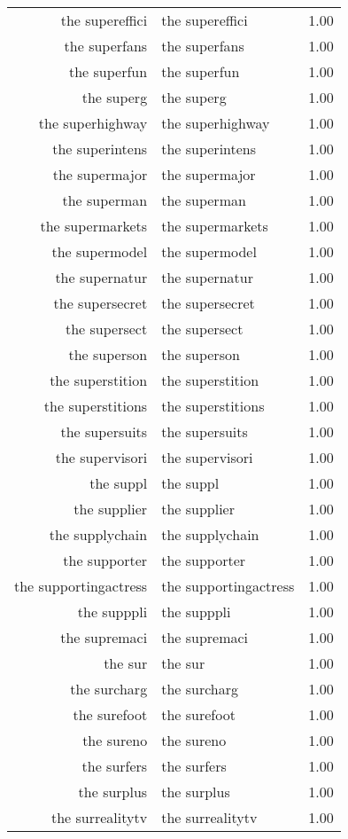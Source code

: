 \begin{table}[ht]
\begin{tabular}{rlr}
  the supereffici & the supereffici & 1.00 \\ 
  the superfans & the superfans & 1.00 \\ 
  the superfun & the superfun & 1.00 \\ 
  the superg & the superg & 1.00 \\ 
  the superhighway & the superhighway & 1.00 \\ 
  the superintens & the superintens & 1.00 \\ 
  the supermajor & the supermajor & 1.00 \\ 
  the superman & the superman & 1.00 \\ 
  the supermarkets & the supermarkets & 1.00 \\ 
  the supermodel & the supermodel & 1.00 \\ 
  the supernatur & the supernatur & 1.00 \\ 
  the supersecret & the supersecret & 1.00 \\ 
  the supersect & the supersect & 1.00 \\ 
  the superson & the superson & 1.00 \\ 
  the superstition & the superstition & 1.00 \\ 
  the superstitions & the superstitions & 1.00 \\ 
  the supersuits & the supersuits & 1.00 \\ 
  the supervisori & the supervisori & 1.00 \\ 
  the suppl & the suppl & 1.00 \\ 
  the supplier & the supplier & 1.00 \\ 
  the supplychain & the supplychain & 1.00 \\ 
  the supporter & the supporter & 1.00 \\ 
  the supportingactress & the supportingactress & 1.00 \\ 
  the supppli & the supppli & 1.00 \\ 
  the supremaci & the supremaci & 1.00 \\ 
  the sur & the sur & 1.00 \\ 
  the surcharg & the surcharg & 1.00 \\ 
  the surefoot & the surefoot & 1.00 \\ 
  the sureno & the sureno & 1.00 \\ 
  the surfers & the surfers & 1.00 \\ 
  the surplus & the surplus & 1.00 \\ 
  the surrealitytv & the surrealitytv & 1.00 \\ 

\end{tabular}
\end{table}
